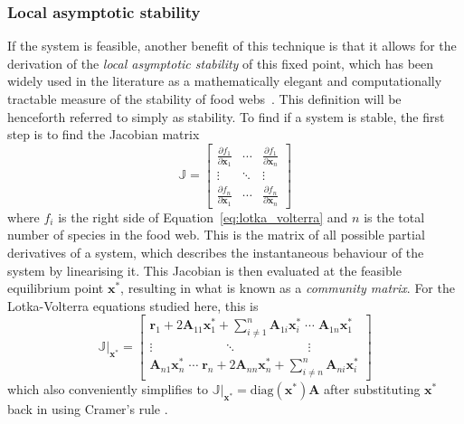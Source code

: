 \subsubsection{Local asymptotic stability}
If the system is feasible, another benefit of this technique is that it allows for the derivation of the \emph{local asymptotic stability} of this fixed point, which has been widely used in the literature as a mathematically elegant and computationally tractable measure of the stability of food webs~\cite{May1973, Emmerson2004}. This definition will be henceforth referred to simply as stability. 
To find if a system is stable, the first step is to find the Jacobian matrix
\begin{equation}
  \mathbb{J} = \begin{bmatrix}
    \frac{\partial f_1}{\partial \mathbf{x}_1} & 
    \cdots &
    \frac{\partial f_1}{\partial \mathbf{x}_n} \\
    \vdots &
    \ddots &
    \vdots \\
    \frac{\partial f_n}{\partial \mathbf{x}_1} & 
    \cdots &
    \frac{\partial f_n}{\partial \mathbf{x}_n}
  \end{bmatrix}
\end{equation}
where $f_i$ is the right side of Equation~\eqref{eq:lotka_volterra} and $n$ is the total number of species in the food web.
This is the matrix of all possible partial derivatives of a system, which describes the instantaneous behaviour of the system by linearising it. This Jacobian is then evaluated at the feasible equilibrium point $\mathbf{x}^*$, resulting in what is known as a \emph{community matrix}. For the Lotka-Volterra equations studied here, this is
\begin{equation}
  \mathbb{J}|_\mathbf{x^*} = \begin{bmatrix}
    \mathbf{r}_1 + 2\mathbf{A}_{11}\mathbf{x}_1^* + \sum_{i\neq 1}^n\mathbf{A}_{1i}\mathbf{x}_i^*
    \;\cdots\;
    \mathbf{A}_{1n}\mathbf{x}_1^*\\
    \vdots 
    \qquad\qquad\quad\;\;\ddots\qquad\qquad\quad\;\;
    \vdots \\
    \mathbf{A}_{n1}\mathbf{x}_n^*
    \;\cdots\;
    \mathbf{r}_n + 2\mathbf{A}_{nn}\mathbf{x}_n^* + \sum_{i\neq n}^n\mathbf{A}_{ni}\mathbf{x}_i^* 
  \end{bmatrix}
  \label{eq:jacobian_evaluated}
\end{equation}
which also conveniently simplifies to $\mathbb{J}|_\mathbf{x^*} = \mathrm{diag}(\mathbf{x^*})\mathbf{A}$ after substituting $\mathbf{x^*}$ back in using Cramer's rule \cite{May1973}.
